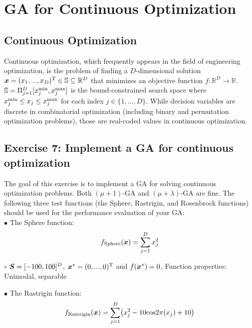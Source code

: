 \documentclass[11pt]{article}
\def\vector#1{\mbox{\boldmath $#1$}}
\def\vector#1{\mbox{\boldmath $#1$}}
\begin{document}
\clearpage

\section{GA for Continuous Optimization}


\subsection{Continuous Optimization}

Continuous optimization, which frequently appears in the field of engineering optimization, is the problem of finding a $D$-dimensional solution $\vector{x} = (x_1, ..., x_D)^{\rm T} \in \mathbb{S} \subseteq \mathbb{R}^D$  that minimizes an objective function $f: \mathbb{R}^D \rightarrow \mathbb{R}$. $\mathbb{S} = \Pi^D_{j=1} [x^{\rm min}_j, x^{\rm max}_j]$ is the bound-constrained search space where $x^{\rm min}_j \leq x_j \leq x^{\rm max}_j$ for each index $j \in \{1, ..., D\}$.
While decision variables are discrete in combinatorial optimization (including binary and permutation optimization problems), those are real-coded values in continuous optimization.


\subsection{Exercise 7: Implement a GA for continuous optimization}

The goal of this exercise is to implement a GA for solving continuous optimization problems.
Both $(\mu + 1)$-GA and $(\mu + \lambda)$-GA are fine. 
%
The following three test functions (the Sphere, Rastrigin, and Rosenbrock functions) should be used for the performance evaluation of your GA:
\\
%
\noindent $\bullet$ The Sphere function:
%
\begin{align}
\label{eqn:sphere}
f_{\rm Sphere}(\vector{x}) = \sum^D_{j=1} x^2_j
\end{align}
%

$\circ$ $\vector{S} = [-100, 100]^D$, $\vector{x}^* = (0, ..., 0)^{\rm T}$ and $f(\vector{x}^*) = 0$, Function properties: Unimodal, separable

\noindent $\bullet$ The Rastrigin function:
%
\begin{align}
\label{eqn:rastrigin}
f_{\rm Rastrigin}(\vector{x}) =   \sum^{D}_{j = 1} \bigl(x^2_j  - 10{\rm cos}2 \pi (x_j) +10\bigr)
\end{align}
%
\end{document}
